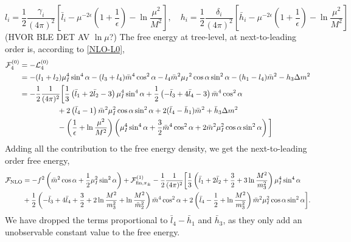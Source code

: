 \begin{equation}
    l_i = \frac{1}{2} \frac{\gamma_i}{(4 \pi)^2}
    \left[\bar l_i - \mu^{-2 \epsilon}\left(1+ \frac{1}{\epsilon}\right) - \ln\frac{\mu^2}{M^2}\right], \quad
    h_i = \frac{1}{2} \frac{\delta_i}{(4 \pi)^2}
    \left[\bar h_i - \mu^{-2 \epsilon}\left(1+ \frac{1}{\epsilon}\right)- \ln\frac{\mu^2}{M^2}\right]
\end{equation}
(HVOR BLE DET AV $\ln \mu$?)
The free energy at tree-level, at next-to-leading order is, according to \cref{NLO-L0}, 
\begin{align*}
    \mathcal{F}^{(0)}_4
    & 
    = - \mathcal{L}_4^{(0)} 
    \\
    & = 
    - (l_1 + l_2)\mu_I^4 \sin^4{\alpha}
    - (l_3 + l_4)\bar m^4 \cos^2{\alpha}
    - l_4 \bar m^2 \mu_I{}^2 \cos{\alpha} \sin^2{\alpha}
    -(h_1- l_4) \bar m^2
    - h_3 \Delta m^2
    \\
    & = 
    - \frac{1}{2} \frac{1}{(4 \pi)^2}
    \bigg[
        \frac{1}{3}
        \left( 
            \bar l_1 + 2 \bar l_2 - 3
        \right) \mu_I^4 \sin^4 \alpha
        +
        \frac{1}{2}
        \left(
            - \bar l_3 + 4 \bar l_4 - 3
        \right) \bar m^4 \cos^2\alpha
        \\
        & \quad \quad \quad \quad \quad
        + 2 \left(\bar l_4 - 1\right)
        \bar m^2 \mu_I^2 \cos\alpha \sin^2 \alpha
        + 2 (\bar l_4 - \bar h_1) \bar m^2
        + \bar h_3 \Delta m^2
        \\
        & \quad \quad \quad \quad \quad
        - 
        \left(\frac{1}{\epsilon} + \ln \frac{\mu^2}{M^2}\right) 
        \left(
            \mu_I^4\sin^4\alpha + \frac{3}{2} \bar m^4 \cos^2 \alpha
            + 2 \bar m^2 \mu_I^2 \cos\alpha \sin^2 \alpha
        \right) 
    \bigg] 
\end{align*}
Adding all the contribution to the free energy density, we get the next-to-leading order free energy,
\begin{align}
    \nonumber
    \Ef_{\mathrm{NLO}} &=
    - f^2 \left(\bar m^2 \cos \alpha + \frac{1}{2}\mu_I^2 \sin^2 \alpha\right)
    + \Ef^{(1)}_{\mathrm{fin}, \pi_\pm}
    - \frac{1}{2}\frac{1}{(4 \pi)^2}
    \bigg[
        \frac{1}{3}
        \left( 
            \bar l_1 + 2 \bar l_2 + \frac{3}{2} + 3 \ln \frac{M^2}{m_3^2}
        \right) \mu_I^4 \sin^4 \alpha
        \\ %
        &
        +
        \frac{1}{2}
        \left(
            - \bar l_3 + 4 \bar l_4 + \frac{3}{2} + 2\ln \frac{M^2}{m_3^2}
            + \ln \frac{M^2}{\tilde m^2_2}
        \right) \bar m^4 \cos^2\alpha 
        + 2 \left(\bar l_4 - \frac{1}{2} + \ln \frac{M^2}{m_3^2}\right)
        \bar m^2 \mu_I^2 \cos\alpha \sin^2 \alpha
        \label{NLO free energy}
    \bigg].
\end{align}
We have dropped the terms proportional to $\bar l_4 - \bar h_1$ and $\bar h_3$, as they only add an unobservable constant value to the free energy.

